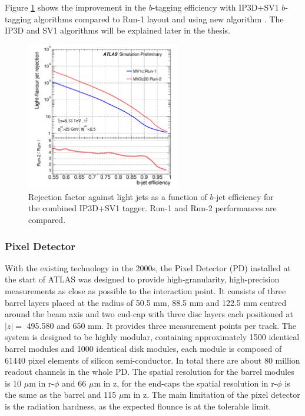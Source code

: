 Figure \ref{fig:chap2:ATLAS:ITK:IBL:Btag} shows the improvement in the $b$-tagging efficiency with IP3D+SV1 $b$-tagging algorithms compared to Run-1 layout and using new algorithm \cite{IBL_Btag, IBL_Btag2}. The IP3D and SV1 algorithms will be explained later in the thesis.
\begin{figure}[htbp]
    \centering
    \includegraphics[width=0.6\textwidth]{Ch2/Img/IBL_btag2.png}
    \caption{Rejection factor against light jets as a function of $b$-jet efficiency for the combined IP3D+SV1 tagger. Run-1 and Run-2 performances are compared.}
    \label{fig:chap2:ATLAS:ITK:IBL:Btag}
\end{figure}

\subsubsection{Pixel Detector}
\label{chap2:ATLAS:ITK:PD}
With the existing technology in the 2000s, the Pixel Detector (PD) installed at the start of ATLAS was designed to provide high-granularity, high-precision measurements as close as possible to the interaction point. It consists of three barrel layers placed at the radius of 50.5 mm, 88.5 mm and 122.5 mm centred around the beam axis and two end-cap with three disc layers each positioned at $|z|=$ 495.580 and 650 mm. It provides three measurement points per track. The system is designed to be highly modular, containing approximately 1500 identical barrel modules and 1000 identical disk modules, each module is composed of 61440 pixel elements of silicon semi-conductor. In total there are about 80 million readout channels in the whole PD. The spatial resolution for the barrel modules is 10 $\mu$m in r-$\phi$ and 66 $\mu$m in z, for the end-caps the spatial resolution in r-$\phi$ is the same as the barrel and 115 $\mu$m in z. The main limitation of the pixel detector is the radiation hardness, as the expected flounce is at the tolerable limit. 

